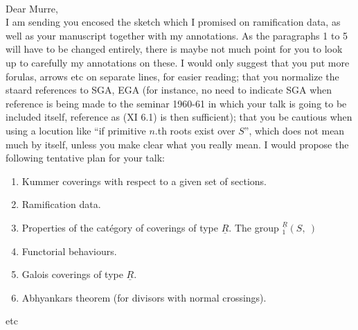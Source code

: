 \\

Dear Murre,\\

I am sending you encosed the sketch which I promised on ramification
data, as well as your manuscript together with my annotations. As the paragraphs 1 to 5 will have to be changed entirely, there is maybe not much point for you to look up to carefully my annotations on these.  I would only suggest that you put more forulas, arrows etc on  separate lines, for easier reading; that you normalize the staard references to SGA, EGA (for instance, no need to indicate SGA when reference is being made to the seminar 1960-61 in which your talk is going to be included itself, reference as (XI 6.1) is then sufficient); that you be cautious when using a locution like ``if primitive $n$.th roots exist over $S$'', which does not mean much by itself, unless you make clear what you really mean. I would propose the following tentative plan for your talk:

\begin{enumerate}[label={}]
\item[1.] Kummer coverings with respect to a given set of sections.
\item[2.] Ramification data.
\reversemarginpar
{}
\normalmarginpar
\item[3.] Properties of the catégory of coverings of type $\underline{R}$. The group ${}_{1}^{\underline{R}}(S,\ )$
\item[4.] Functorial behaviours.
\item[5.] Galois coverings of type $\underline{R}$.
\item[6.] Abhyankars theorem (for divisors with normal crossings).
\end{enumerate}
etc

